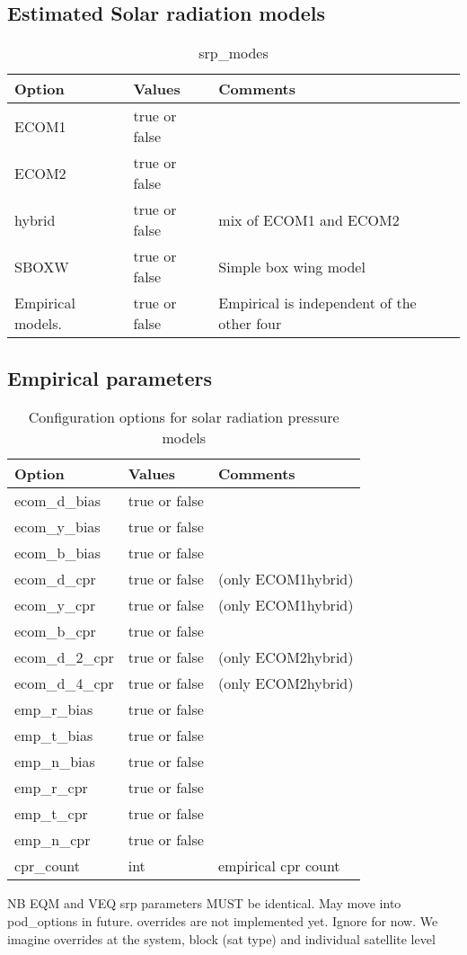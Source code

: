 \subsection{Estimated Solar radiation models}
\begin{table}[h!]
	\begin{tabular}{|p{2.5cm}|p{2.5cm}|p{5cm}|}
		\hline
		Option & Values & Comments \\
		\hline
		ECOM1  & true or false & \\ 
		ECOM2  & true or false & \\
		hybrid & true or false &  mix of ECOM1 and ECOM2\\
		SBOXW  & true or  false & Simple box wing model\\
		Empirical models. & true or false & Empirical is independent of the other four\\
		\hline
	\end{tabular}
	\caption{srp\_modes}
	\label{table:label_name}
\end{table}
%
\subsection{Empirical parameters}
\begin{table}[h!]
	\begin{tabular}{|p{2.5cm}|p{2.5cm}|p{5cm}|}
	\hline
	Option & Values & Comments \\
	\hline
	ecom\_d\_bias & true or false & \\ 
	ecom\_y\_bias & true or false & \\ 
	ecom\_b\_bias & true or false & \\ 
	ecom\_d\_cpr & true or false & (only ECOM1\/hybrid)\\ 
	ecom\_y\_cpr & true or false & (only ECOM1\/hybrid)\\ 
	ecom\_b\_cpr & true or false & \\
	ecom\_d\_2\_cpr & true or false &  (only ECOM2\/hybrid)\\ 
	ecom\_d\_4\_cpr & true or false & (only ECOM2\/hybrid) \\
	emp\_r\_bias & true or false & \\
	emp\_t\_bias & true or false & \\ 
	emp\_n\_bias  & true or false & \\
	emp\_r\_cpr  & true or false & \\
	emp\_t\_cpr  & true or false & \\
	emp\_n\_cpr & true or false & \\
	cpr\_count  & int & empirical cpr count \\
	\hline
\end{tabular}
\caption{Configuration options for solar radiation pressure models}
\label{table:label_name}
\end{table}

NB EQM and VEQ srp parameters MUST be identical. May move into pod\_options in future.
overrides are not implemented yet. Ignore for now. We imagine overrides at the system, block (sat type) and individual satellite level
